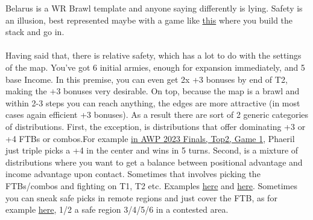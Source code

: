 Belarus is a WR Brawl template and anyone saying differently is lying. Safety is an illusion, best represented maybe with a game like \href{https://www.warzone.com/MultiPlayer?GameID=36572705}{this} where you build the stack and go in.
\\
\\
Having said that, there is relative safety, which has a lot to do with the settings of the map. You've got 6 initial armies, enough for expansion immediately, and 5 base Income. In this premise, you can even get 2x +3 bonuses by end of T2, making the +3 bonuses very desirable. On top, because the map is a brawl and within 2-3 steps you can reach anything, the edges are more attractive (in most cases again efficient +3 bonuses). As a result there are sort of 2 generic categories of distributions. First, the exception, is distributions that offer dominating +3 or +4 FTBs or combos.For example \href{https://www.warzone.com/MultiPlayer?GameID=35888891}{in AWP 2023 Finals, Top2, Game 1}, Phaeril just triple picks a +4 in the center and wins in 5 turns. Second, is a mixture of distributions where you want to get a balance between positional advantage and income advantage upon contact. Sometimes that involves picking the FTBs/combos and fighting on T1, T2 etc. Examples \href{https://www.warzone.com/MultiPlayer?GameID=40269350}{here} and \href{https://www.warzone.com/MultiPlayer?GameID=36572705}{here}. Sometimes you can sneak safe picks in remote regions and just cover the FTB, as for example \href{https://www.warzone.com/MultiPlayer?GameID=40398807}{here}, 1/2 a safe region 3/4/5/6 in a contested area.  

